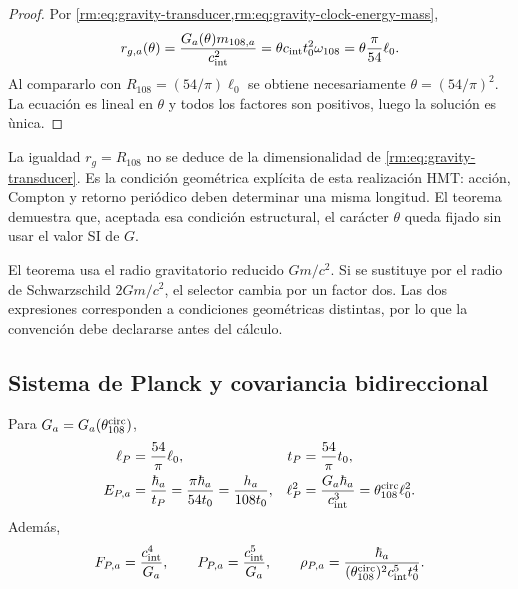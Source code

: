\enlargethispage{7\baselineskip}
\begin{proof}
Por \cref{rm:eq:gravity-transducer,rm:eq:gravity-clock-energy-mass},
\[
r_{g,a}(\theta)
=\frac{G_a(\theta)m_{108,a}}{c_{\rm int}^2}
=\theta c_{\rm int}t_0^2\omega_{108}
=\theta\frac{\pi}{54}\ell_0.
\]
Al compararlo con
\(R_{108}=(54/\pi)\ell_0\) se obtiene necesariamente
\(\theta=(54/\pi)^2\). La ecuaci\'on es lineal en \(\theta\) y todos los
factores son positivos, luego la soluci\'on es \`unica.
\end{proof}

La igualdad \(r_g=R_{108}\) no se deduce de la dimensionalidad de
\cref{rm:eq:gravity-transducer}. Es la condición geométrica explícita de esta
realizaci\'on HMT: acci\'on, Compton y retorno peri\'odico deben determinar una misma
longitud. El teorema demuestra que, aceptada esa condición estructural, el
carácter \(\theta\) queda fijado sin usar el valor SI de \(G\).

\begin{remark}
El teorema usa el radio gravitatorio reducido \(Gm/c^2\). Si se sustituye
por el radio de Schwarzschild \(2Gm/c^2\), el selector cambia por un factor
dos. Las dos expresiones corresponden a condiciones geom\'etricas distintas,
por lo que la convenci\'on debe declararse antes del c\'alculo.
\end{remark}

\subsection{Sistema de Planck y covariancia bidireccional}

\begin{corollary}
\label{rm:cor:gravity-planck-family}
Para \(G_a=G_a(\theta_{108}^{\rm circ})\),
\begin{align}
\ell_P&=\frac{54}{\pi}\ell_0,
&t_P&=\frac{54}{\pi}t_0,
\label{rm:eq:gravity-planck-length-time}\\
E_{P,a}&=\frac{\hbar_a}{t_P}
=\frac{\pi\hbar_a}{54t_0}
=\frac{h_a}{108t_0},
&\ell_P^2&=\frac{G_a\hbar_a}{c_{\rm int}^3}
=\theta_{108}^{\rm circ}\ell_0^2.
\label{rm:eq:gravity-planck-energy-area}
\end{align}
Adem\'as,
\begin{equation}
\label{rm:eq:gravity-planck-force-power-density}
F_{P,a}=\frac{c_{\rm int}^4}{G_a},
\qquad
P_{P,a}=\frac{c_{\rm int}^5}{G_a},
\qquad
\rho_{P,a}=\frac{\hbar_a}
{(\theta_{108}^{\rm circ})^2c_{\rm int}^5t_0^4}.
\end{equation}
\end{corollary}

